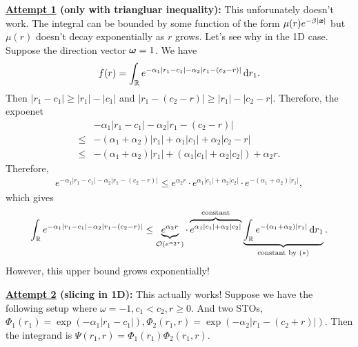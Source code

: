 \documentclass[12pt]{article}
\begin{document}
\textbf{\underline{Attempt 1} (only with triangluar inequality):} This unforunately doesn't work. The integral can be bounded by some function of the form \(\mu(r)e^{-\beta|\bm{x}|}\) but \(\mu(r)\) doesn't decay exponentially as \(r\) grows. Let's see why in the 1D case. Suppose the direction vector \(\bm{\omega} = 1\). We have
\begin{align*}
    f(r) = \int_{\mathbb {R}} e^{-\alpha_1|r_1 - c_1| - \alpha_2 |r_1 - (c_2 - r)| } \mathop{}\!\mathrm{d} r_1.
\end{align*}
Then \(|r_1 - c_1| \geq |r_1| - |c_1|\) and \(|r_1 - (c_2 - r)| \geq |r_1| - |c_2 - r|\).
Therefore, the expoenet
\begin{align*}
    &-\alpha_1|r_1 - c_1| - \alpha_2 |r_1 - (c_2 - r)| \\
    \leq& -(\alpha_1 + \alpha_2)|r_1| + \alpha_1|c_1| + \alpha_2|c_2 - r|  \\
    \leq& -(\alpha_1 + \alpha_2)|r_1| + (\alpha_1|c_1| + \alpha_2|c_2|) + \alpha_2 r.
\end{align*}
Therefore,
\begin{align*}
    e^{-\alpha_1|r_1 - c_1| - \alpha_2 |r_1 - (c_2 - r)|} \leq e^{\alpha_2 r} \cdot e^{\alpha_1|c_1| + \alpha_2|c_2|}\cdot e^{-(\alpha_1 + \alpha_2)|r_1|},
\end{align*}
which gives
\begin{align*}
    \int_{\mathbb {R}}  e^{-\alpha_1|r_1 - c_1| - \alpha_2 |r_1 - (c_2 - r)|}
    \leq 
    \underbrace{e^{\alpha_2 r}}_{\mathcal{O}(e^{\alpha_2r})}
    \cdot 
    \overbrace{e^{\alpha_1|c_1| + \alpha_2|c_2|}}^{\text{constant}} 
    \underbrace{\int_{\mathbb {R}} e^{-(\alpha_1 + \alpha_2)|r_1|} \mathop{}\!\mathrm{d} r_1}_{\text{constant by }(\ast)}.
\end{align*}
However, this upper bound grows exponentially!

\textbf{\underline{Attempt 2} (slicing in 1D):} This actually works!
Suppose we have the following setup where \(\omega = -1, c_1 < c_2, r \geq 0\). And two STOs, \(\Phi_1(r_1) = \exp(-\alpha_1|r_1-c_1|), \Phi_2(r_1,r) = \exp(-\alpha_2|r_1 - (c_2 + r)|)\).
Then the integrand is \(\Psi(r_1,r) = \Phi_1(r_1) \Phi_2(r_1,r)\). 
\end{document}
